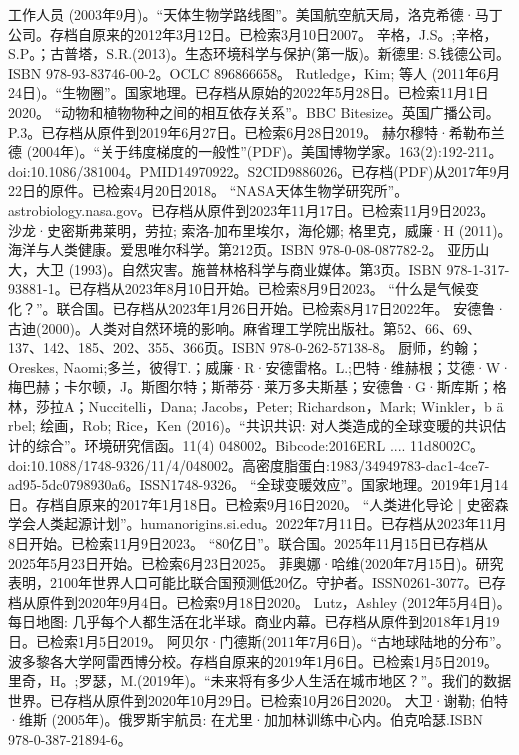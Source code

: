 \begin{enumerate}
 工作人员 (2003年9月)。“天体生物学路线图”。美国航空航天局，洛克希德·马丁公司。存档自原来的2012年3月12日。已检索3月10日2007。
 辛格，J.S。;辛格，S.P。；古普塔，S.R.(2013)。生态环境科学与保护(第一版)。新德里: S.钱德公司。ISBN 978-93-83746-00-2。OCLC 896866658。
 Rutledge，Kim; 等人 (2011年6月24日)。“生物圈”。国家地理。已存档从原始的2022年5月28日。已检索11月1日2020。
 “动物和植物物种之间的相互依存关系”。BBC Bitesize。英国广播公司。P.3。已存档从原件到2019年6月27日。已检索6月28日2019。
 赫尔穆特·希勒布兰德 (2004年)。“关于纬度梯度的一般性”(PDF)。美国博物学家。163(2):192-211。doi:10.1086/381004。PMID14970922。S2CID9886026。已存档(PDF)从2017年9月22日的原件。已检索4月20日2018。   
 “NASA天体生物学研究所”。astrobiology.nasa.gov。已存档从原件到2023年11月17日。已检索11月9日2023。
 沙龙·史密斯弗莱明，劳拉; 索洛-加布里埃尔，海伦娜; 格里克，威廉·H (2011)。海洋与人类健康。爱思唯尔科学。第212页。ISBN 978-0-08-087782-2。
 亚历山大，大卫 (1993)。自然灾害。施普林格科学与商业媒体。第3页。ISBN 978-1-317-93881-1。已存档从2023年8月10日开始。已检索8月9日2023。
 “什么是气候变化？”。联合国。已存档从2023年1月26日开始。已检索8月17日2022年。
 安德鲁·古迪(2000)。人类对自然环境的影响。麻省理工学院出版社。第52、66、69、137、142、185、202、355、366页。ISBN 978-0-262-57138-8。
 厨师，约翰；Oreskes, Naomi;多兰，彼得T.；威廉·R·安德雷格。L.;巴特·维赫根；艾德·W·梅巴赫；卡尔顿，J。斯图尔特；斯蒂芬·莱万多夫斯基；安德鲁·G·斯库斯；格林，莎拉A；Nuccitelli，Dana; Jacobs，Peter; Richardson，Mark; Winkler，b ä rbel; 绘画，Rob; Rice，Ken (2016)。“共识共识: 对人类造成的全球变暖的共识估计的综合”。环境研究信函。11(4) 048002。Bibcode:2016ERL .... 11d8002C。doi:10.1088/1748-9326/11/4/048002。高密度脂蛋白:1983/34949783-dac1-4ce7-ad95-5dc0798930a6。ISSN1748-9326。 
 “全球变暖效应”。国家地理。2019年1月14日。存档自原来的2017年1月18日。已检索9月16日2020。
 “人类进化导论 | 史密森学会人类起源计划”。humanorigins.si.edu。2022年7月11日。已存档从2023年11月8日开始。已检索11月9日2023。
 “80亿日”。联合国。2025年11月15日已存档从2025年5月23日开始。已检索6月23日2025。
 菲奥娜·哈维(2020年7月15日)。研究表明，2100年世界人口可能比联合国预测低20亿。守护者。ISSN0261-3077。已存档从原件到2020年9月4日。已检索9月18日2020。 
 Lutz，Ashley (2012年5月4日)。每日地图: 几乎每个人都生活在北半球。商业内幕。已存档从原件到2018年1月19日。已检索1月5日2019。
 阿贝尔·门德斯(2011年7月6日)。“古地球陆地的分布”。波多黎各大学阿雷西博分校。存档自原来的2019年1月6日。已检索1月5日2019。
 里奇，H。;罗瑟，M.(2019年)。“未来将有多少人生活在城市地区？”。我们的数据世界。已存档从原件到2020年10月29日。已检索10月26日2020。
 大卫·谢勒; 伯特·维斯 (2005年)。俄罗斯宇航员: 在尤里·加加林训练中心内。伯克哈瑟.ISBN 978-0-387-21894-6。

\end{enumerate}
